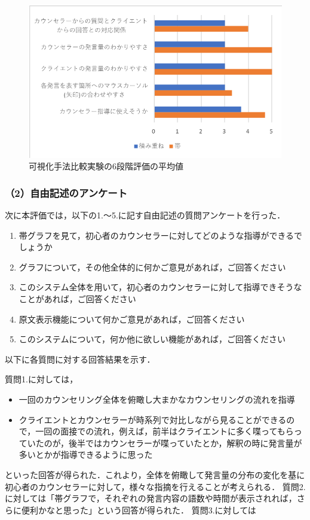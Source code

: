 \documentclass[shuuron]{kuee}
\begin{document}
\begin{figure}
  \begin{center}
    \includegraphics[width=\linewidth]{keijouAnketo.png}
  \end{center}
  \caption{可視化手法比較実験の6段階評価の平均値}
  \label{fig:keijouAnketo}
\end{figure}


\subsubsection{（2）自由記述のアンケート}

次に本評価では，以下の1.〜5.に記す自由記述の質問アンケートを行った．

\begin{enumerate}
  \item 帯グラフを見て，初心者のカウンセラーに対してどのような指導ができるでしょうか
  \item グラフについて，その他全体的に何かご意見があれば，ご回答ください
  \item このシステム全体を用いて，初心者のカウンセラーに対して指導できそうなことがあれば，ご回答ください
  \item 原文表示機能について何かご意見があれば，ご回答ください
  \item このシステムについて，何か他に欲しい機能があれば，ご回答ください
\end{enumerate}

以下に各質問に対する回答結果を示す．

質問1.に対しては，
\begin{itemize}

  \item 一回のカウンセリング全体を俯瞰し大まかなカウンセリングの流れを指導
  \item クライエントとカウンセラーが時系列で対比しながら見ることができるので，一回の面接での流れ，例えば，前半はクライエントに多く喋ってもらっていたのが，後半ではカウンセラーが喋っていたとか，解釈の時に発言量が多いとかが指導できるように思った
\end{itemize}
といった回答が得られた．これより，全体を俯瞰して発言量の分布の変化を基に初心者のカウンセラーに対して，様々な指摘を行えることが考えられる．
質問2.に対しては「帯グラフで，それぞれの発言内容の語数や時間が表示されれば，さらに便利かなと思った」という回答が得られた．
質問3.に対しては
\end{document}
